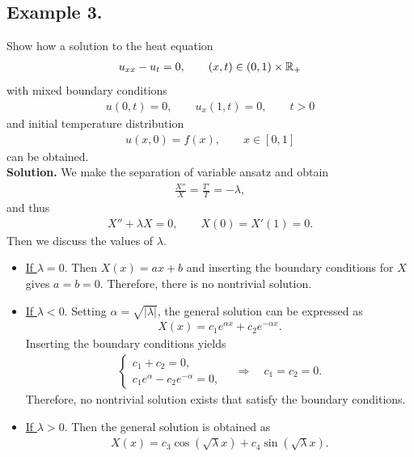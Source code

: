 \documentclass[12pt, a4paper]{article}
\begin{document}
\begin{spacing}{1.1}
\section*{Example 3.}

Show how a solution to the heat equation
\begin{align*}
u_{xx} - u_t = 0, \qquad (x, t)\in (0, 1)\times \mathbb{R}_{+}
\end{align*}
with mixed boundary conditions
\begin{align*}
u(0, t) = 0,\qquad u_x(1, t) = 0, \qquad t>0
\end{align*}
and initial temperature distribution
\begin{align*}
u(x, 0) = f(x), \qquad x\in [0, 1]
\end{align*}
can be obtained.\\
\textbf{Solution.} We make the separation of variable ansatz and obtain 
\begin{align*}
\frac{X''}{X} = \frac{T'}{T} = -\lambda,
\end{align*}
and thus
\begin{align*}
X'' + \lambda X = 0, \qquad X(0) = X'(1) = 0.
\end{align*}
Then we discuss the values of $\lambda$.
\begin{itemize}
	\item \underline{If $\lambda = 0$}. Then $X(x) = ax + b$ and inserting the boundary conditions for $X$ gives $a = b = 0$. Therefore, there is no nontrivial solution.
	\item \underline{If $\lambda < 0$}. Setting $\alpha = \sqrt{|\lambda|}$, the general solution can be expressed as
	\begin{align*}
	X(x) = c_1 e^{\alpha x} + c_2 e^{-\alpha x}.
	\end{align*}
	Inserting the boundary conditions yields
	\begin{align*}
	\left\{
	\begin{array}{l}
	c_1 + c_2 = 0, \\
	c_1e^{\alpha} - c_2e^{-\alpha} = 0,
	\end{array}
	\right. \quad\Rightarrow\quad c_1 = c_2 = 0.
	\end{align*}
	Therefore, no nontrivial solution exists that satisfy the boundary conditions.
	\item \underline{If $\lambda > 0$}. Then the general solution is obtained as
	\begin{align*}
	X(x) = c_3\cos(\sqrt{\lambda}x) + c_4\sin(\sqrt{\lambda}x).
	\end{align*}

\end{itemize}
\end{spacing}
\end{document}
